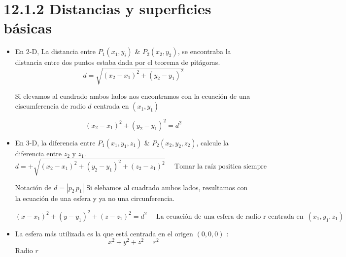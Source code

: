 


\section{12.1.2 Distancias y superficies básicas}
\begin{itemize}
    \item En 2-D, La distancia entre $P_1(x_1,y_i)$ \& $P_2(x_2,y_2)$, se encontraba la distancia entre dos puntos estaba dada por el teorema de pitágoras. 
        \[
          d = \sqrt{(x_2-x_1)^2+(y_2-y_1)^2}
        \]
        \begin{center}
           Si elevamos al cuadrado ambos lados nos encontramos con la ecuación de una ciscumferencia de radio $d$ centrada en $(x_1,y_1)$
        \end{center}
        \[
          (x_2-x_1)^2+(y_2-y_1)^2=d^2
        \]
    
    \item En 3-D, la diferencia entre $P_1(x_1,y_1,z_1)$ \& $P_2(x_2,y_2,z_2)$, calcule la diferencia entre $z_2$ y $z_1$.
        \[
          d = + \sqrt{(x_2-x_1)^2+(y_2-y_1)^2+(z_2-z_1)^2} \quad \text{  Tomar la raíz positica siempre  }
        \]
        \begin{center}
           Notación de $d=\left| p_2 \, p_1 \right| $ \newline 
           Si elebamos al cuadrado ambos lados, resultamos con la ecuación de una esfera y ya no una circunferencia.
        \end{center}
        \[
            (x-x_1)^2+(y-y_1)^2+(z-z_1)^2 = d^2 \quad \text{  La ecuación de una esfera de radio r centrada en   } \, (x_1,y_1,z_1)
        \]
    
    \item La esfera más utilizada es la que está centrada en el origen $(0,0,0)$ :
        \[
          x^2+y^2+z^2=r^2
        \]
        Radio $r$
\end{itemize}


